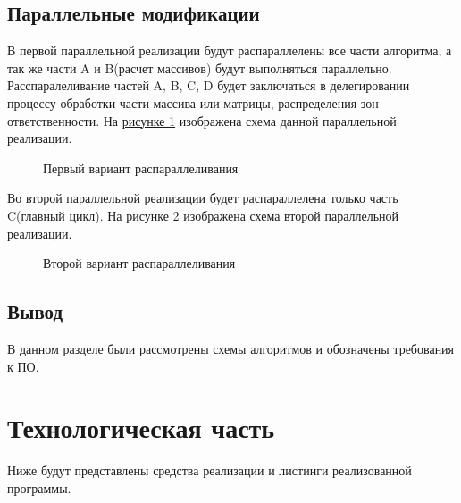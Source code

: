 \documentclass{article}
\begin{document}
		\subsection{Параллельные модификации}
		В первой параллельной реализации будут распараллелены все части алгоритма, а так же части A и B(расчет массивов) будут выполняться параллельно. Расспаралеливание частей A, B, C, D будет заключаться в делегировании процессу обработки части массива или матрицы, распределения зон ответственности. На \hyperref[firstParallel]{рисунке  \ref{firstParallel}} изображена схема данной параллельной реализации.
\begin{figure}[h!]
		\caption{Первый вариант распараллеливания}
		\label{firstParallel}
	\end{figure}
\newline
		\indent Во второй параллельной реализации будет распараллелена только часть C(главный цикл). На \hyperref[secondParallel]{рисунке  \ref{secondParallel}} изображена схема второй параллельной реализации.
\begin{figure}[h!]
		\caption{Второй вариант распараллеливания}
		\label{secondParallel}
	\end{figure}
	\subsection{Вывод}
	В данном разделе были рассмотрены схемы алгоритмов и обозначены требования к ПО.
	
	\newpage
	\section{Технологическая часть}
	Ниже будут представлены средства реализации и листинги реализованной программы.
\end{document}
